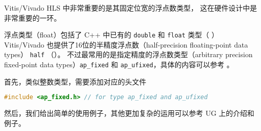 \documentclass[Chinese,TC,use boldface,simple Names]{beaulivre}
\begin{document}
      Vitis/Vivado HLS 中非常重要的是其固定位宽的浮点数类型，
      这在硬件设计中是非常重要的一环。
      \begin{definition}[浮点类型]
        浮点类型（float）包括了 C++ 中已有的 \texttt{double} 和 \texttt{float} 类型（   ）
        Vitis/Vivado 也提供了16位的半精度浮点数（half-precision floating-point data types） \texttt{half} （）。
        不过最常用的是指定精度的浮点数类型（arbitrary precision fixed-point data types）\texttt{ap\_fixed} 和 \texttt{ap\_ufixed}，具体的内容可以参考   。
      \end{definition}
      
      \begin{example}[浮点类型]
        首先，类似整数类型，需要添加对应的头文件
        \begin{lstlisting}[language=C++,numbers=none]
#include <ap_fixed.h> // for type ap_fixed and ap_ufixed
        \end{lstlisting}
        然后，我们给出简单的使用例子，其他更加复杂的运用可以参考 UG 上的介绍和例子。
      \end{example}
      
\end{document}
